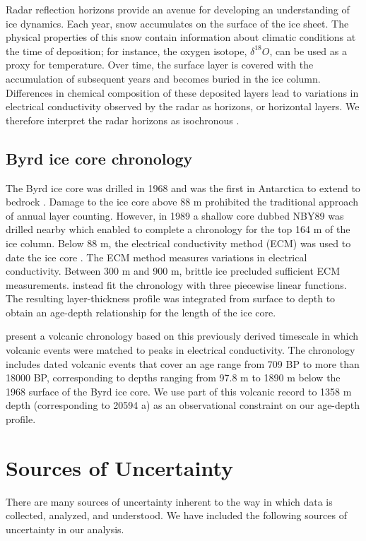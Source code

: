 \documentclass[12pt]{article}
\begin{document}
Radar reflection horizons provide an avenue for developing an understanding of ice dynamics. Each year, snow accumulates on the surface of the ice sheet. The physical properties of this snow contain information about climatic conditions at the time of deposition; for instance, the oxygen isotope, $\delta^{18}O$, can be used as a proxy for temperature. Over time, the surface layer is covered with the accumulation of subsequent years and becomes buried in the ice column. Differences in chemical composition of these deposited layers lead to variations in electrical conductivity observed by the radar as horizons, or horizontal layers. We therefore interpret the radar horizons as isochronous \citep{eisen2004}.

\subsection{Byrd ice core chronology}

The Byrd ice core was drilled in 1968 and was the first in Antarctica to extend to bedrock \citep{gow1968}. Damage to the ice core above 88 m prohibited the traditional approach of annual layer counting. However, in 1989 a shallow core dubbed NBY89 was drilled nearby which enabled \citep{langway1994} to complete a chronology for the top 164 m of the ice column. Below 88 m, the electrical conductivity method (ECM) was used to date the ice core \citep{hammer1994}. The ECM method measures variations in electrical conductivity. Between 300 m and 900 m, brittle ice precluded sufficient ECM measurements. \citet{hammer1994} instead fit the chronology with three piecewise linear functions. The resulting layer-thickness profile was integrated from surface to depth to obtain an age-depth relationship for the length of the ice core.

\citet{hammer1997} present a volcanic chronology based on this previously derived timescale in which volcanic events were matched to peaks in electrical conductivity. The chronology includes dated volcanic events that cover an age range from 709 BP to more than 18000 BP, corresponding to depths ranging from 97.8 m to 1890 m below the 1968 surface of the Byrd ice core. We use part of this volcanic record to 1358 m depth (corresponding to 20594 a) as an observational constraint on our age-depth profile.



\section{Sources of Uncertainty}\label{unc}
There are many sources of uncertainty inherent to the way in which
data is collected, analyzed, and understood. We have included the
following sources of uncertainty in our analysis.
\end{document}
